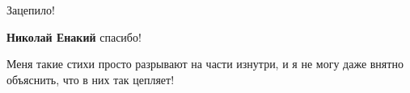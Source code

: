\begin{itemize}
Зацепило!

\begin{itemize}
 
\textbf{Николай Енакий} спасибо!
\end{itemize}

 

Меня такие стихи просто разрывают на части изнутри, и я не могу даже внятно
объяснить, что в них так цепляет!

\end{itemize}


